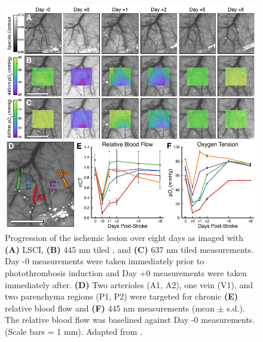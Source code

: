 \begin{figure}
    \includegraphics{figures/chapter_3/photothrombosischronic.pdf}
    \caption[Progression of the ischemic lesion over eight days as imaged with \textbf{(A)} LSCI, \textbf{(B)} 445 nm tiled , and \textbf{(C)} 637 nm tiled  measurements. Day -0 measurements were taken immediately prior to photothrombosis induction and Day +0 measurements were taken immediately after. \textbf{(D)} Two arterioles (A1, A2), one vein (V1), and two parenchyma regions (P1, P2) were targeted for chronic \textbf{(E)} relative blood flow and \textbf{(F)} 445 nm  measurements (mean $\pm$ s.d.). The relative blood flow was baselined against Day -0 measurements. (Scale bars = 1 mm).]{
        \label{fig:photothrombosischronic}
        Progression of the ischemic lesion over eight days as imaged with \textbf{(A)} LSCI, \textbf{(B)} 445 nm tiled , and \textbf{(C)} 637 nm tiled  measurements. Day -0 measurements were taken immediately prior to photothrombosis induction and Day +0 measurements were taken immediately after. \textbf{(D)} Two arterioles (A1, A2), one vein (V1), and two parenchyma regions (P1, P2) were targeted for chronic \textbf{(E)} relative blood flow and \textbf{(F)} 445 nm  measurements (mean $\pm$ s.d.). The relative blood flow was baselined against Day -0 measurements. (Scale bars = 1 mm). Adapted from \cite{Sullender:2018ff}.
    }
\end{figure}

